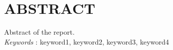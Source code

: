 \clearpage
{}
{}
\chapter*{ABSTRACT}
Abstract of the report. \\

\textit{Keywords} : keyword1, keyword2, keyword3, keyword4
